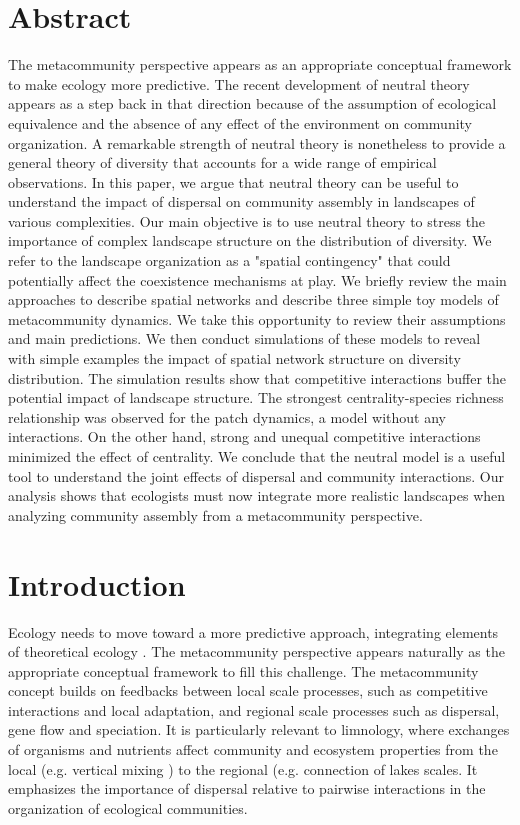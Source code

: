 \documentclass[12pt]{article}
\begin{document}
\section*{Abstract} 
The metacommunity perspective appears as an appropriate
conceptual framework to make ecology more predictive. The recent development of
neutral theory appears as a step back in that direction because of the
assumption of ecological equivalence and the absence of any effect of the
environment on community organization. A remarkable strength of neutral theory
is nonetheless to provide a general theory of diversity that accounts for a wide
range of empirical observations. In this paper, we argue that neutral theory can
be useful to understand the impact of dispersal on community assembly in
landscapes of various complexities. Our main objective is to use neutral theory
to stress the importance of complex landscape structure on the
distribution of diversity. We refer to the landscape organization as a "spatial
contingency" that could potentially affect the coexistence mechanisms at play.
We briefly review the main approaches to describe spatial networks and describe
three simple toy models of metacommunity dynamics. We take this opportunity to
review their assumptions and main predictions. We then conduct 
simulations of these models to reveal with simple examples the impact of spatial
network structure on diversity distribution. The simulation results show that
competitive interactions buffer the potential impact of landscape structure. The
strongest centrality-species richness relationship was observed for the patch
dynamics, a model without any interactions. On the other hand, strong and
unequal competitive interactions minimized the effect of centrality. We conclude
that the neutral model is a useful tool to understand the joint effects of
dispersal and community interactions. Our analysis shows that ecologists must
now integrate more realistic landscapes when analyzing community assembly from a
metacommunity perspective. 
\newpage

\section*{Introduction}

Ecology needs to move toward a more predictive approach, integrating elements of
theoretical ecology \parencite{Thuiller2013}. The metacommunity perspective
\parencite{Leibold2004a} appears naturally as the appropriate conceptual
framework to fill this challenge. The metacommunity concept builds on feedbacks
between local scale processes, such as competitive interactions and local
adaptation, and regional scale processes such as dispersal, gene flow and
speciation. It is particularly relevant to limnology, where exchanges of
organisms and nutrients affect community and ecosystem properties from the local
(e.g. vertical mixing \parencite{Ryabov2011}) to the regional (e.g. connection
of lakes \parencite{Leibold2004b, Gravel2010a} scales. It emphasizes the
importance of dispersal relative to pairwise interactions in the organization of
ecological communities.
\end{document}

